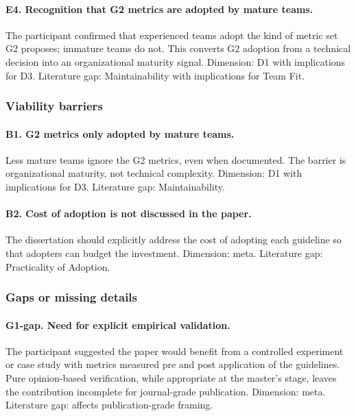 \paragraph*{E4. Recognition that G2 metrics are adopted by mature teams.} The participant confirmed that experienced teams adopt the kind of metric set G2 proposes; immature teams do not. This converts G2 adoption from a technical decision into an organizational maturity signal. Dimension: D1 with implications for D3. Literature gap: Maintainability with implications for Team Fit.

\subsubsection*{Viability barriers}

\paragraph*{B1. G2 metrics only adopted by mature teams.} Less mature teams ignore the G2 metrics, even when documented. The barrier is organizational maturity, not technical complexity. Dimension: D1 with implications for D3. Literature gap: Maintainability.

\paragraph*{B2. Cost of adoption is not discussed in the paper.} The dissertation should explicitly address the cost of adopting each guideline so that adopters can budget the investment. Dimension: meta. Literature gap: Practicality of Adoption.

\subsubsection*{Gaps or missing details}

\paragraph*{G1-gap. Need for explicit empirical validation.} The participant suggested the paper would benefit from a controlled experiment or case study with metrics measured pre and post application of the guidelines. Pure opinion-based verification, while appropriate at the master's stage, leaves the contribution incomplete for journal-grade publication. Dimension: meta. Literature gap: affects publication-grade framing.

